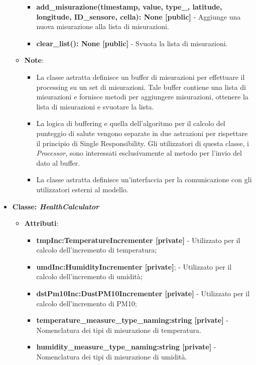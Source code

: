 \begin{itemize}
\begin{itemize}
\begin{itemize}
        \item \textbf{add\_misurazione(timestamp, value, type\_, latitude, longitude, ID\_sensore, cella): None [public]} - Aggiunge una nuova misurazione alla lista di misurazioni.
        \item \textbf{clear\_list(): None [public]} - Svuota la lista di misurazioni.
    \end{itemize}
    \item\textbf{Note}:
        \begin{itemize}
               \item La classe astratta definisce un buffer di misurazioni per effettuare il processing su un set di misurazioni. Tale buffer contiene una lista di misurazioni e fornisce metodi per aggiungere misurazioni, ottenere la lista di misurazioni e svuotare la lista.
                \item La logica di buffering e quella dell'algoritmo per il calcolo del punteggio di salute vengono separate in due astrazioni per rispettare il principio di Single Responsibility. Gli utilizzatori di questa classe, i \textit{Processor}, sono interessati esclusivamente al metodo per l'invio del dato al buffer.
                \item La classe astratta definisce un'interfaccia per la comunicazione con gli utilizzatori esterni al modello.
        \end{itemize}
    \end{itemize}
    \item{\textbf{Classe: \textit{HealthCalculator}}}
    \begin{itemize}
    \item\textbf{Attributi}:
        \begin{itemize}
        \item \textbf{tmpInc:TemperatureIncrementer [private]} - Utilizzato per il calcolo dell'incremento di temperatura;
        \item \textbf{umdInc:HumidityIncrementer [private]}; - Utilizzato per il calcolo dell'incremento di umidità;
        \item \textbf{dstPm10Inc:DustPM10Incrementer [private]} - Utilizzato per il calcolo dell'incremento di PM10;
        \item \textbf{temperature\_measure\_type\_naming:string [private]} - Nomenclatura dei tipi di misurazione di temperatura.
        \item \textbf{humidity\_measure\_type\_naming:string [private]} - Nomenclatura dei tipi di misurazione di umidità.

\end{itemize}
\end{itemize}
\end{itemize}
